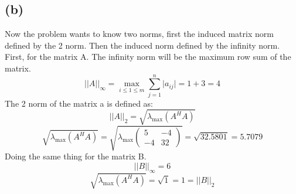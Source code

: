\documentclass{article}
\begin{document}
\subsection*{(b)}
Now the problem wants to know two norms, first the induced matrix norm defined by the 2 norm. Then the induced norm defined by the infinity norm.\\
First, for the matrix A. The infinity norm will be the maximum row sum of the matrix.
\[\lvert\lvert A\rvert\rvert_{\infty}=\max_{i\leq 1\leq m}\sum_{j=1}^n\lvert a_{ij}\rvert=1+3=4\]
The 2 norm of the matrix a is defined as:
\[\lvert\lvert A\rvert\rvert_2=\sqrt{\lambda_{\text{max}}(A^HA)}\]
\[\sqrt{\lambda_{\text{max}}(A^HA)}=\sqrt{\lambda_{\text{max}}\begin{pmatrix}5&-4\\-4&32\end{pmatrix}}=\sqrt{32.5801}=5.7079\]
Doing the same thing for the matrix B.
\[\lvert\lvert B\rvert\rvert_{\infty}=6\]
\[\sqrt{\lambda_{\text{max}}(A^HA)}=\sqrt{1}=1=\lvert\lvert B\rvert\rvert_2\]
\end{document}

